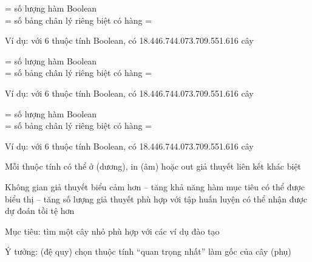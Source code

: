 \documentclass{article}
\begin{document}
\begin{huge}

= số lượng hàm Boolean\\
= số bảng chân lý riêng biệt có  hàng = 

Ví dụ: với 6 thuộc tính Boolean, có 18.446.744.073.709.551.616 cây



= số lượng hàm Boolean\\
= số bảng chân lý riêng biệt có  hàng = 

Ví dụ: với 6 thuộc tính Boolean, có 18.446.744.073.709.551.616 cây





= số lượng hàm Boolean\\
= số bảng chân lý riêng biệt có  hàng = 

Ví dụ: với 6 thuộc tính Boolean, có 18.446.744.073.709.551.616 cây


Mỗi thuộc tính có thể ở (dương), in (âm) hoặc out\nl
\mat{$\implies$}  giả thuyết liên kết khác biệt

Không gian giả thuyết biểu cảm hơn\al
 -- tăng khả năng hàm mục tiêu có thể được biểu thị \quad\smiley\al
 -- tăng số lượng giả thuyết phù hợp với tập huấn luyện\nl
    \mat{$\implies$} có thể nhận được dự đoán tồi tệ hơn\quad\frowny



Mục tiêu: tìm một cây nhỏ phù hợp với các ví dụ đào tạo

Ý tưởng: (đệ quy) chọn thuộc tính ``quan trọng nhất'' làm gốc của cây (phụ)


\end{huge}
\end{document}
